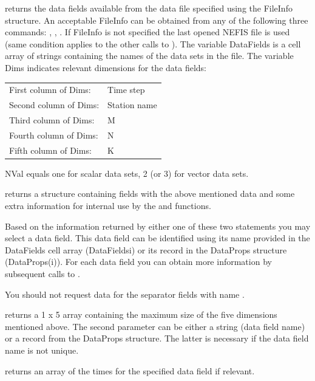  returns the data fields available from the data file specified using the FileInfo structure.
An acceptable FileInfo can be obtained from any of the following three commands: , , \vsuse.
If FileInfo is not specified the last opened NEFIS file is used (same condition applies to the other calls to ).
The variable DataFields is a cell array of strings containing the names of the data sets in the file.
The variable Dims indicates relevant dimensions for the data fields:

\begin{tabular}{ll}
First column of Dims:  & Time step \\
Second column of Dims: & Station name \\
Third column of Dims:  & M \\
Fourth column of Dims: & N \\
Fifth column of Dims:  & K \\
\end{tabular}

NVal equals one for scalar data sets, 2 (or 3) for vector data sets.

 returns a structure containing fields with the above mentioned data and some extra information for internal use by the  and  functions.

Based on the information returned by either one of these two  statements you may select a data field.
This data field can be identified using its name provided in the DataFields cell array (DataFields{i}) or its record in the DataProps structure (DataProps(i)).
For each data field you can obtain more information by subsequent calls to .

\begin{Remark}
\item You should not request data for the separator fields with name .
\end{Remark}

 returns a 1 x 5 array containing the maximum size of the five dimensions mentioned above.
The second parameter can be either a string (data field name) or a record from the DataProps structure.
The latter is necessary if the data field name is not unique.

 returns an array of the times for the specified data field if relevant.

